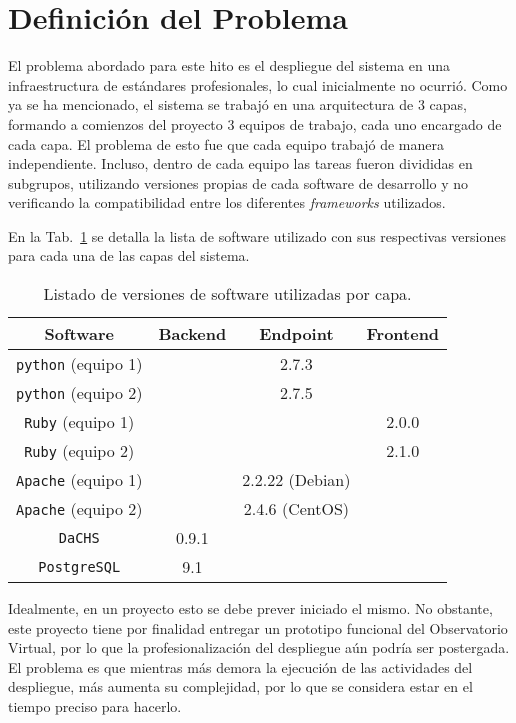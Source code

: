 \section{Definición del Problema}

El problema abordado para este hito es el despliegue del sistema en una infraestructura de estándares profesionales, lo cual inicialmente no ocurrió. Como ya se ha mencionado, el sistema se trabajó en una arquitectura de 3 capas, formando a comienzos del proyecto 3 equipos de trabajo, cada uno encargado de cada capa. El problema de esto fue que cada equipo trabajó de manera independiente. Incluso, dentro de cada equipo las tareas fueron divididas en subgrupos, utilizando versiones propias de cada software de desarrollo y no verificando la compatibilidad entre los diferentes \emph{frameworks} utilizados.

En la Tab.~\ref{tab:versiones} se detalla la lista de software utilizado con sus respectivas versiones para cada una de las capas del sistema.

\begin{table}[ht!]
	\begin{center}
		\begin{tabular}{c|c|c|c}
			Software & Backend & Endpoint & Frontend \\\hline\hline
			\texttt{python} (equipo 1) &  & 2.7.3 &   \\\hline
			\texttt{python} (equipo 2) &  & 2.7.5 &   \\\hline
			\texttt{Ruby} (equipo 1) &  &  & 2.0.0  \\\hline
			\texttt{Ruby} (equipo 2) &  &  & 2.1.0  \\\hline
			\texttt{Apache} (equipo 1) &  & 2.2.22 (Debian) &   \\\hline
			\texttt{Apache} (equipo 2) &  & 2.4.6 (CentOS) &   \\\hline
			\texttt{DaCHS} & 0.9.1 &  &   \\\hline
			\texttt{PostgreSQL} & 9.1 &  &   \\
		\end{tabular}
	\end{center}
	\caption{Listado de versiones de software utilizadas por capa.}\label{tab:versiones}
\end{table}

Idealmente, en un proyecto esto se debe prever iniciado el mismo. No obstante, este proyecto tiene por finalidad entregar un prototipo funcional del Observatorio Virtual, por lo que la profesionalización del despliegue aún podría ser postergada. El problema es que mientras más demora la ejecución de las actividades del despliegue, más aumenta su complejidad, por lo que se considera estar en el tiempo preciso para hacerlo.

